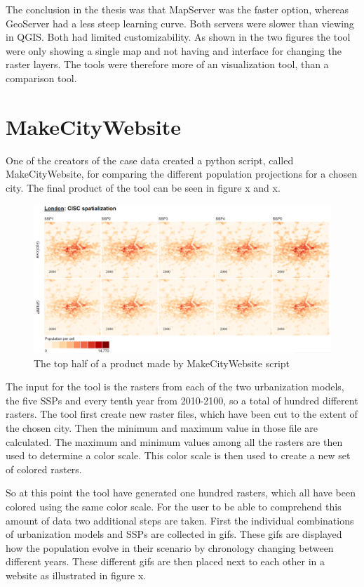 The conclusion in the thesis was that MapServer was the faster option, whereas GeoServer had a less steep learning curve. Both servers were slower than viewing in QGIS. Both had limited customizability. As shown in the two figures the tool were only showing a single map and not having and interface for changing the raster layers. The tools were therefore more of an visualization tool, than a comparison tool.



\section{MakeCityWebsite}
One of the creators of the case data created a python script, called MakeCityWebsite, for comparing the different population projections for a chosen city.  The final product of the tool can be seen in figure x and x. 

\begin{figure} [H]
	\centering
	\includegraphics[width=.8\textwidth]{Pictures/MakeCityWebsite1}
	\caption{The top half of a product made by MakeCityWebsite script}
	\label{MakeCityWebsite1}
\end{figure}

The input for the tool is the rasters from each of the two urbanization models, the five SSPs and every tenth year from 2010-2100, so a total of hundred different rasters.
The tool first create new raster files, which have been cut to the extent of the chosen city. Then the minimum and maximum value in those file are calculated. The maximum and minimum values among all the rasters are then used to determine a color scale. This color scale is then used to create a new set of colored rasters.

So at this point the tool have generated one hundred rasters, which all have been colored using the same color scale. For the user to be able to comprehend this amount of data two additional steps are taken. First the individual combinations of urbanization models and SSPs are collected in gifs. These gifs are displayed how the population evolve in their scenario by chronology changing between different years. These different gifs are then placed next to each other in a website as illustrated in figure x. 

